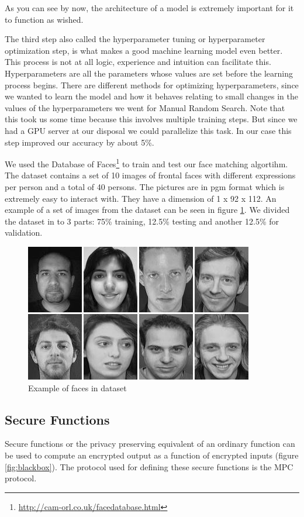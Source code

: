 As you can see by now, the architecture of a model is extremely important for it to function as wished.

The third step also called the hyperparameter tuning or hyperparameter optimization step, is what makes a good machine learning model even better. This process is not at all logic, experience and intuition can facilitate this. Hyperparameters are all the parameters whose values are set before the learning process begins. There are different methods for optimizing hyperparameters, since we wanted to learn the model and how it behaves relating to small changes in the values of the hyperparameters we went for Manual Random Search. Note that this took us some time because this involves multiple training steps. But since we had a GPU server at our disposal we could parallelize this task. In our case this step improved our accuracy by about 5\%.

We used the Database of Faces\footnote{\url{http://cam-orl.co.uk/facedatabase.html}} to train and test our face matching algortihm. The dataset contains a set of 10 images of frontal faces with different expressions per person and a total of 40 persons. The pictures are in pgm format which is extremely easy to interact with. They have a dimension of 1 x 92 x 112. An example of a set of images from the dataset can be seen in figure \ref{fig:databaseoffaces}. We divided the dataset in to 3 parts: 75\% training, 12.5\% testing and another 12.5\% for validation.

\begin{figure}[H]
  \includegraphics[scale=0.7]{fig/databaseoffacess.png}
  \centering
  \caption{Example of faces in dataset}
  \label{fig:databaseoffaces}
\end{figure}

\subsection{Secure Functions}
\label{Secure Functions}
Secure functions or the privacy preserving equivalent of an ordinary function can be used to compute an encrypted output as a function of encrypted inputs (figure \ref{fig:blackbox}). The protocol used for defining these secure functions is the MPC protocol.

